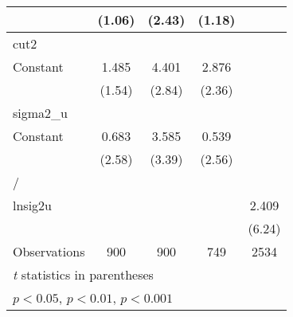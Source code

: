 {\begin{tabular}{l*{4}{c}}
                    &      (1.06)         &      (2.43)         &      (1.18)         &                     \\
\hline
cut2                &                     &                     &                     &                     \\
Constant            &       1.485         &       4.401\sym{**} &       2.876\sym{*}  &                     \\
                    &      (1.54)         &      (2.84)         &      (2.36)         &                     \\
\hline
sigma2\_u            &                     &                     &                     &                     \\
Constant            &       0.683\sym{**} &       3.585\sym{***}&       0.539\sym{*}  &                     \\
                    &      (2.58)         &      (3.39)         &      (2.56)         &                     \\
\hline
/                   &                     &                     &                     &                     \\
lnsig2u             &                     &                     &                     &       2.409\sym{***}\\
                    &                     &                     &                     &      (6.24)         \\
\hline
Observations        &         900         &         900         &         749         &        2534         \\
\hline\hline
\multicolumn{5}{l}{\footnotesize \textit{t} statistics in parentheses}\\
\multicolumn{5}{l}{\footnotesize \sym{*} \(p<0.05\), \sym{**} \(p<0.01\), \sym{***} \(p<0.001\)}\\
\end{tabular}
}
